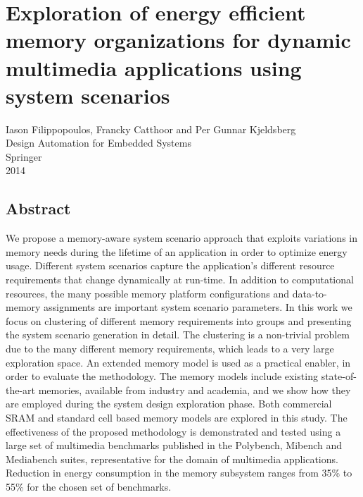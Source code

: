 \chapter{Exploration of energy efficient memory organizations for dynamic multimedia applications using system scenarios}
\label{DAES}

\begin{center}
Iason Filippopoulos, Francky Catthoor and Per Gunnar Kjeldsberg
\\
Design Automation for Embedded Systems
\\
Springer
\\
2014
\end{center}
\afterpage{\null\newpage}
\newpage

\vspace*{\fill}
\section*{\hspace*{\fill} Abstract \hspace*{\fill}}
We propose a memory-aware system scenario approach that exploits variations in memory needs during the lifetime of an application in order to optimize energy usage. 
Different system scenarios capture the application's different resource requirements that change dynamically at run-time. 
In addition to computational resources, the many possible memory platform configurations and data-to-memory assignments are important system scenario parameters. 
In this work we focus on clustering of different memory requirements into groups and presenting the system scenario generation in detail.
The clustering is a non-trivial problem due to the many different memory requirements, which leads to a very large exploration space.
An extended memory model is used as a practical enabler, in order to evaluate the methodology. 
The memory models include existing state-of-the-art memories, available from industry and academia, and we show how they are employed during the system design exploration phase. 
Both commercial SRAM and standard cell based memory models are explored in this study. 
The effectiveness of the proposed methodology is demonstrated and tested using a large set of multimedia benchmarks published in the Polybench, Mibench and Mediabench suites,
representative for the domain of multimedia applications.
Reduction in energy consumption in the memory subsystem ranges from 35\% to 55\% for the chosen set of benchmarks.
\vspace*{\fill}
\afterpage{\null\newpage}
\newpage

